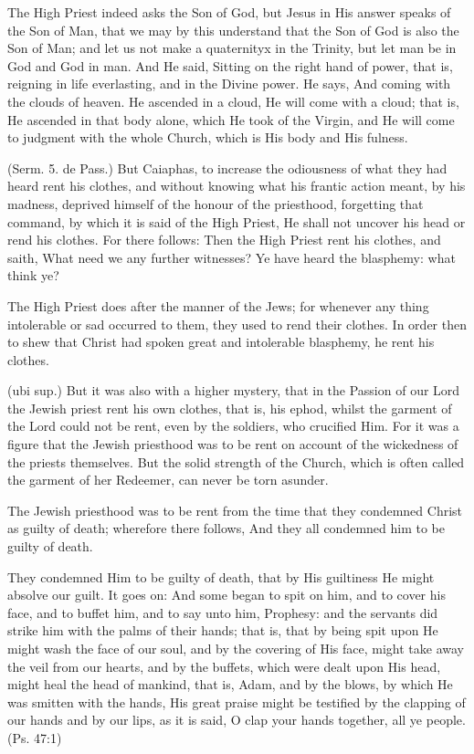  The High Priest indeed asks the Son of God, but Jesus in His answer speaks of the Son of Man, that we may by this understand that the Son of God is also the Son of Man; and let us not make a quaternityx in the Trinity, but let man be in God and God in man. And He said, Sitting on the right hand of power, that is, reigning in life everlasting, and in the Divine power. He says, And coming with the clouds of heaven. He ascended in a cloud, He will come with a cloud; that is, He ascended in that body alone, which He took of the Virgin, and He will come to judgment with the whole Church, which is His body and His fulness.

 (Serm. 5. de Pass.) But Caiaphas, to increase the odiousness of what they had heard rent his clothes, and without knowing what his frantic action meant, by his madness, deprived himself of the honour of the priesthood, forgetting that command, by which it is said of the High Priest, He shall not uncover his head or rend his clothes. For there follows: Then the High Priest rent his clothes, and saith, What need we any further witnesses? Ye have heard the blasphemy: what think ye?

 The High Priest does after the manner of the Jews; for whenever any thing intolerable or sad occurred to them, they used to rend their clothes. In order then to shew that Christ had spoken great and intolerable blasphemy, he rent his clothes.

 (ubi sup.) But it was also with a higher mystery, that in the Passion of our Lord the Jewish priest rent his own clothes, that is, his ephod, whilst the garment of the Lord could not be rent, even by the soldiers, who crucified Him. For it was a figure that the Jewish priesthood was to be rent on account of the wickedness of the priests themselves. But the solid strength of the Church, which is often called the garment of her Redeemer, can never be torn asunder.

 The Jewish priesthood was to be rent from the time that they condemned Christ as guilty of death; wherefore there follows, And they all condemned him to be guilty of death.

 They condemned Him to be guilty of death, that by His guiltiness He might absolve our guilt. It goes on: And some began to spit on him, and to cover his face, and to buffet him, and to say unto him, Prophesy: and the servants did strike him with the palms of their hands; that is, that by being spit upon He might wash the face of our soul, and by the covering of His face, might take away the veil from our hearts, and by the buffets, which were dealt upon His head, might heal the head of mankind, that is, Adam, and by the blows, by which He was smitten with the hands, His great praise might be testified by the clapping of our hands and by our lips, as it is said, O clap your hands together, all ye people. (Ps. 47:1)

